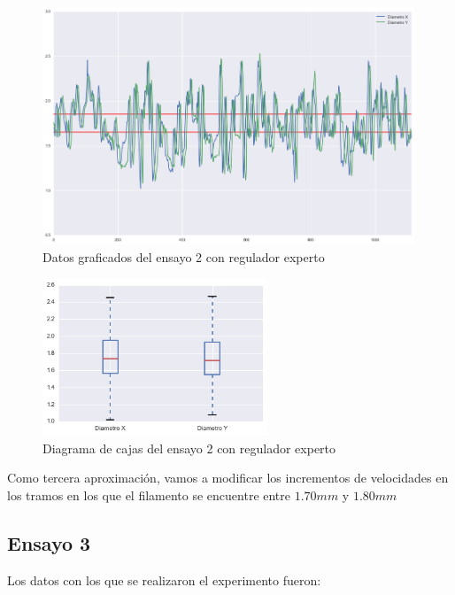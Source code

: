 \begin{figure}[H]
    \centering
    \includegraphics[width=0.99\textwidth]{images/producciones/12082015/output_9_e1.png}
    \caption{Datos graficados del ensayo 2 con regulador experto}
    \label{fig:reg_graf2}
\end{figure}

\begin{figure}[H]
    \centering
    \includegraphics[width=0.6\textwidth]{images/producciones/12082015/output_10_e1.png}
    \caption{Diagrama de cajas del ensayo 2 con regulador experto}
    \label{fig:reg_cajas2}
\end{figure}

Como tercera aproximación, vamos a modificar los incrementos de velocidades en los tramos en los que el filamento se encuentre entre  $1.70 mm$ y $1.80 mm$

\subsection{Ensayo 3}

Los datos con los que se realizaron el experimento fueron:

